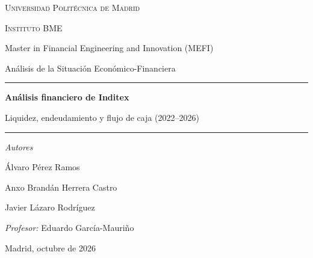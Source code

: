 \documentclass[11pt,a4paper]{article}
\begin{document}
\begin{titlepage}
  \centering
  \vspace*{1.2cm}
  {\large\color{navy}\textsc{Universidad Politécnica de Madrid}\par}
  \vspace{0.15cm}
  {\large\color{navy}\textsc{Instituto BME}\par}
  \vspace{0.6cm}
  {\normalsize Master in Financial Engineering and Innovation (MEFI)\par}
  {\normalsize Análisis de la Situación Económico-Financiera\par}

  \vspace{3.2cm}
  {\color{navy}\rule{\textwidth}{1.2pt}}\par
  \vspace{0.5cm}
  {\LARGE\bfseries\color{navy} Análisis financiero de Inditex\par}
  \vspace{0.35cm}
  {\Large\color{accent} Liquidez, endeudamiento y flujo de caja (2022--2026)\par}
  \vspace{0.5cm}
  {\color{navy}\rule{\textwidth}{0.4pt}}\par

  \vspace{3.2cm}
  {\large\color{accent}\textit{Autores}\par}
  \vspace{0.3cm}
  {\large Álvaro Pérez Ramos\par}
  \vspace{0.1cm}
  {\large Anxo Brandán Herrera Castro\par}
  \vspace{0.1cm}
  {\large Javier Lázaro Rodríguez\par}

  \vspace{1.4cm}
  {\normalsize\textit{Profesor:} Eduardo García-Mauriño\par}

  \vfill
  {\normalsize Madrid, octubre de 2026\par}
\end{titlepage}

\tableofcontents
\vspace{1.5em}
\listoffigures
\listoftables
\clearpage

\end{document}

